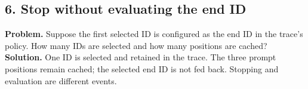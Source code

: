 \subsection*{6. Stop without evaluating the end ID}
\textbf{Problem.} Suppose the first selected ID is configured as the end
ID in the trace's policy. How many IDs are selected and how many positions
are cached?
\textbf{Solution.} One ID is selected and retained in the trace. The
three prompt positions remain cached; the selected end ID is not fed back.
Stopping and evaluation are different events.
